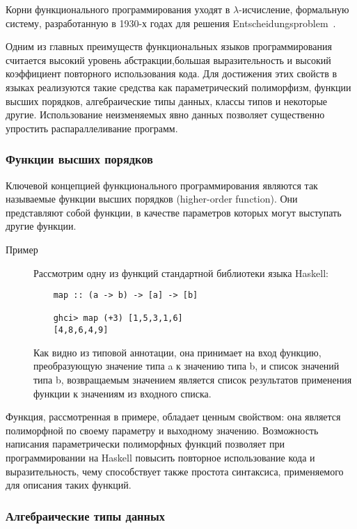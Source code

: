 Корни функционального программирования уходят в $\lambda$-исчисление, формальную систему, разработанную в 1930-х годах для решения Entscheidungsproblem~\autocite{Entscheidungsproblem}.

Одним из главных преимуществ функциональных языков программирования считается высокий уровень абстракции,большая выразительность и высокий коэффициент повторного использования кода. Для достижения этих свойств в языках реализуются такие средства как параметрический полиморфизм, функции высших порядков, алгебраические типы данных, классы типов и некоторые другие. Использование неизменяемых явно данных позволяет существенно упростить распараллеливание программ. 

\subsubsection{Функции высших порядков}
Ключевой концепцией функционального программирования являются так называемые функции высших порядков (higher-order function). Они представляют собой функции, в качестве параметров которых могут выступать другие функции. 

\begin{description}
  \item[Пример] 
  Рассмотрим одну из функций стандартной библиотеки языка Haskell: 
  \begin{lstlisting}
    map :: (a -> b) -> [a] -> [b]

    ghci> map (+3) [1,5,3,1,6]  
    [4,8,6,4,9]
  \end{lstlisting}
  Как видно из типовой аннотации, она принимает на вход функцию, преобразующую значение типа a к значению типа b, и список значений типа b, возвращаемым значением является список результатов применения функции к значениям из входного списка.  
\end{description}

Функция, рассмотренная в примере, обладает ценным свойством: она является полиморфной по своему параметру и выходному значению. Возможность написания параметрически полиморфных функций позволяет при программировании на Haskell повысить повторное использование кода и выразительность, чему способствует также простота синтаксиса, применяемого для описания таких функций.     

\subsubsection{Алгебраические типы данных}

